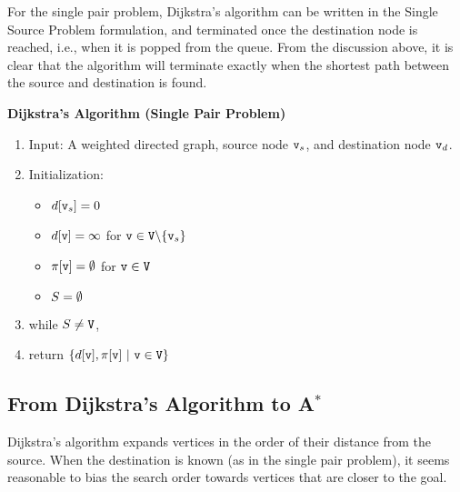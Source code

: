 For the single pair problem, Dijkstra's algorithm can be written in the Single Source Problem formulation, and terminated once the destination node is reached, i.e., when it is popped from the queue. From the discussion above, it is clear that the algorithm will terminate exactly when the shortest path between the source and destination is found.

\begin{algorithm_}\textbf{Dijkstra's Algorithm (Single Pair Problem)}
\begin{enumerate}
\item{Input:} A weighted directed graph, source node ${\tt v}_s$, and destination node ${\tt v}_d$.

\item Initialization:
\begin{itemize}
  \item[] $d[{\tt v}_s] = 0$
  \item[] $d[{\tt v}] = \infty $ for ${\tt v} \in {\tt V}\backslash \{ {\tt v}_s\} $
  \item[] $\pi [{\tt v}] = \emptyset $ for ${\tt v} \in {\tt V}$
  \item[] ${S} = \emptyset $
\end{itemize}

\item while ${S} \ne {\tt V}$,





\item return $\{ d[\nodev],\policy [\nodev] \ |\ \nodev \in \nodes\} $
\end{enumerate}
\end{algorithm_}

\subsection{From Dijkstra's Algorithm to A$^*$}

Dijkstra's algorithm expands vertices in the order of their distance from the source. When the destination is known (as in the single pair problem), it seems reasonable to bias the search order towards vertices that are closer to the goal. 

